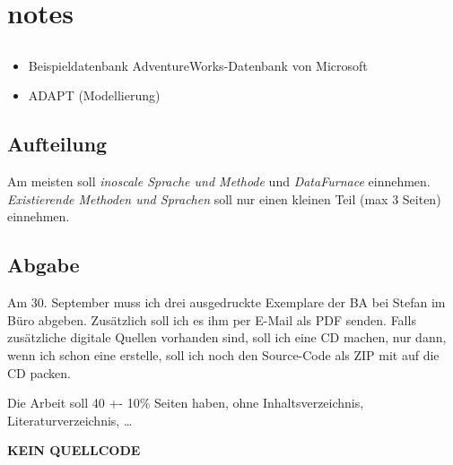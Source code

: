\chapter{notes}
\section{}
\begin{itemize}
  \item Beispieldatenbank AdventureWorks-Datenbank von Microsoft
  \item ADAPT (Modellierung)
\end{itemize}

\section{Aufteilung}
Am meisten soll \textit{inoscale Sprache und Methode} und \textit{DataFurnace} einnehmen. \textit{Existierende Methoden und Sprachen} soll nur einen kleinen Teil (max 3 Seiten) einnehmen.

\section{Abgabe}
Am 30. September muss ich drei ausgedruckte Exemplare der BA bei Stefan im Büro
abgeben. Zusätzlich soll ich es ihm per E-Mail als PDF senden. Falls
zusätzliche digitale Quellen vorhanden sind, soll ich eine CD machen, nur dann,
wenn ich schon eine erstelle, soll ich noch den Source-Code als ZIP mit auf die
CD packen.

Die Arbeit soll 40 +- 10\% Seiten haben, ohne Inhaltsverzeichnis, Literaturverzeichnis, \ldots

\textbf{KEIN QUELLCODE}
